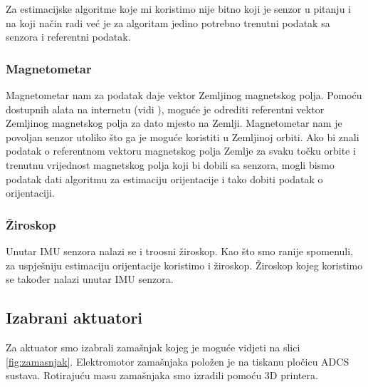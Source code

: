 \documentclass[times, utf8, diplomski, numeric]{templates/template}
\begin{document}
{{{{                Za estimacijske algoritme koje mi koristimo nije bitno koji je senzor u pitanju i na koji način radi već je za algoritam jedino potrebno trenutni podatak sa senzora i referentni podatak. 
            }

            \subsubsection{Magnetometar}{
                Magnetometar nam za podatak daje vektor Zemljinog magnetskog polja. Pomoću dostupnih alata na internetu (vidi \cite{magnetic_model}), moguće je odrediti referentni vektor Zemljinog magnetskog polja za dato mjesto na Zemlji. Magnetometar nam je povoljan senzor utoliko što ga je moguće koristiti u Zemljinoj orbiti. Ako bi znali podatak o referentnom vektoru magnetskog polja Zemlje za svaku točku orbite i trenutnu vrijednost magnetskog polja koji bi dobili sa senzora, mogli bismo podatak dati algoritmu za estimaciju orijentacije i tako dobiti podatak o orijentaciji.
            }

            \subsubsection{Žiroskop}{
                Unutar IMU senzora nalazi se i troosni žiroskop. Kao što smo ranije spomenuli, za uspješniju estimaciju orijentacije koristimo i žiroskop. Žiroskop kojeg koristimo se također nalazi unutar IMU senzora.
            }
        }

        \subsection{Izabrani aktuatori}{
            Za aktuator smo izabrali zamašnjak kojeg je moguće vidjeti na slici \ref{fig:zamasnjak}. Elektromotor zamašnjaka položen je na tiskanu pločicu ADCS sustava. Rotirajuću masu zamašnjaka smo izradili pomoću 3D printera. 

}}}
\end{document}
